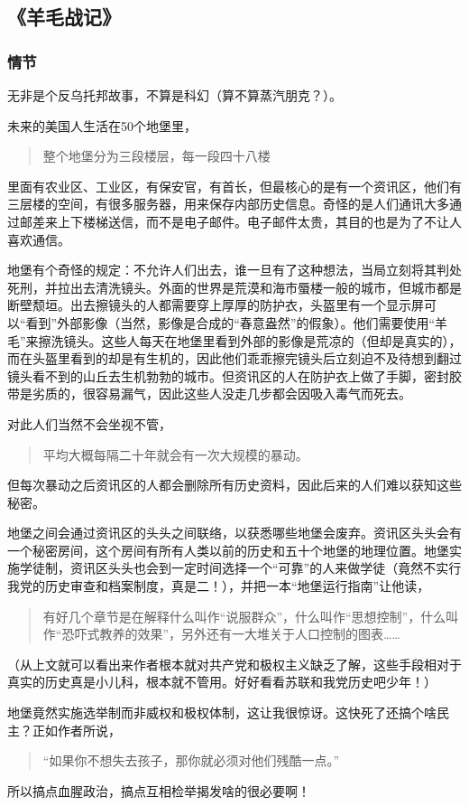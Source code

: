 \subsection{《羊毛战记》}

\subsubsection{情节}
无非是个反乌托邦故事，不算是科幻（算不算蒸汽朋克？）。

未来的美国人生活在50个地堡里，
\begin{quotation}
整个地堡分为三段楼层，每一段四十八楼
\end{quotation}
里面有农业区、工业区，有保安官，有首长，但最核心的是有一个资讯区，他们有三层楼的空间，有很多服务器，用来保存内部历史信息。奇怪的是人们通讯大多通过邮差来上下楼梯送信，而不是电子邮件。电子邮件太贵，其目的也是为了不让人喜欢通信。

地堡有个奇怪的规定：不允许人们出去，谁一旦有了这种想法，当局立刻将其判处死刑，并拉出去清洗镜头。外面的世界是荒漠和海市蜃楼一般的城市，但城市都是断壁颓垣。出去擦镜头的人都需要穿上厚厚的防护衣，头盔里有一个显示屏可以“看到”外部影像（当然，影像是合成的“春意盎然”的假象）。他们需要使用“羊毛”来擦洗镜头。这些人每天在地堡里看到外部的影像是荒凉的（但却是真实的），而在头盔里看到的却是有生机的，因此他们乖乖擦完镜头后立刻迫不及待想到翻过镜头看不到的山丘去生机勃勃的城市。但资讯区的人在防护衣上做了手脚，密封胶带是劣质的，很容易漏气，因此这些人没走几步都会因吸入毒气而死去。

对此人们当然不会坐视不管，
\begin{quotation}
平均大概每隔二十年就会有一次大规模的暴动。
\end{quotation}
但每次暴动之后资讯区的人都会删除所有历史资料，因此后来的人们难以获知这些秘密。

地堡之间会通过资讯区的头头之间联络，以获悉哪些地堡会废弃。资讯区头头会有一个秘密房间，这个房间有所有人类以前的历史和五十个地堡的地理位置。地堡实施学徒制，资讯区头头也会到一定时间选择一个“可靠”的人来做学徒（竟然不实行我党的历史审查和档案制度，真是二！），并把一本“地堡运行指南”让他读，
\begin{quotation}
有好几个章节是在解释什么叫作“说服群众”，什么叫作“思想控制”，什么叫作“恐吓式教养的效果”，另外还有一大堆关于人口控制的图表……
\end{quotation}
（从上文就可以看出来作者根本就对共产党和极权主义缺乏了解，这些手段相对于真实的历史真是小儿科，根本就不管用。好好看看苏联和我党历史吧少年！）

地堡竟然实施选举制而非威权和极权体制，这让我很惊讶。这快死了还搞个啥民主？正如作者所说，
\begin{quotation}
“如果你不想失去孩子，那你就必须对他们残酷一点。”
\end{quotation}
所以搞点血腥政治，搞点互相检举揭发啥的很必要啊！

